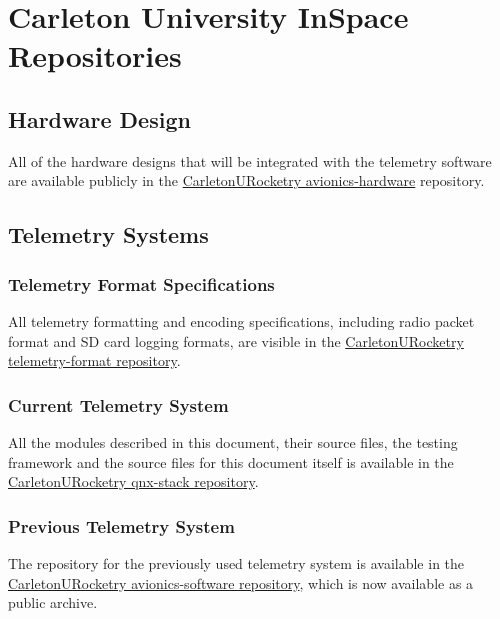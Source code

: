 \appendix

\section{Carleton University InSpace Repositories}

\subsection{Hardware Design}

All of the hardware designs that will be integrated with the telemetry software are available publicly in the
\href{https://github.com/CarletonURocketry/avionics-hardware}{CarletonURocketry avionics-hardware} repository.

\subsection{Telemetry Systems}

\subsubsection{Telemetry Format Specifications} \label{a:telem-format}

All telemetry formatting and encoding specifications, including radio packet format and SD card logging formats, are
visible in the \href{https://github.com/CarletonURocketry/telemetry-format}{CarletonURocketry telemetry-format
    repository}.

\subsubsection{Current Telemetry System} \label{a:cur-system}

All the modules described in this document, their source files, the testing framework and the source files for this
document itself is available in the \href{https://github.com/CarletonURocketry/qnx-stack}{CarletonURocketry qnx-stack
    repository}.

\subsubsection{Previous Telemetry System} \label{a:prev-system}

The repository for the previously used telemetry system is available in the
\href{https://github.com/CarletonURocketry/avionics-software}{CarletonURocketry avionics-software repository}, which is
now available as a public archive.

